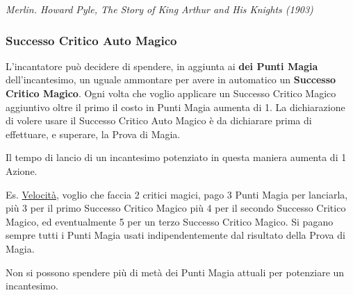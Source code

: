 \begin{multicols}{2}
\begin{center}
\emph{Merlin. Howard Pyle, The Story of King Arthur and His Knights (1903)}
\end{center}

\subsubsection{Successo Critico Auto Magico}\label{magienova}

L'incantatore può decidere di spendere, in aggiunta ai \textbf{dei Punti Magia} dell'incantesimo, un uguale ammontare per avere in automatico un \textbf{Successo Critico Magico}.
Ogni volta che voglio applicare un Successo Critico Magico aggiuntivo oltre il primo il costo in Punti Magia aumenta di 1. La dichiarazione di volere usare il Successo Critico Auto Magico è da dichiarare prima di effettuare, e superare, la Prova di Magia.

Il tempo di lancio di un incantesimo potenziato in questa maniera aumenta di 1 Azione.

Es. \hyperlink{Velocità}{Velocità}, voglio che faccia 2 critici magici, pago 3 Punti Magia per lanciarla, più 3 per il primo Successo Critico Magico più 4 per il secondo Successo Critico Magico, ed eventualmente 5 per un terzo Successo Critico Magico. Si pagano sempre tutti i Punti Magia usati indipendentemente dal risultato della Prova di Magia.

Non si possono spendere più di metà dei Punti Magia attuali per potenziare un incantesimo.



\end{multicols}
